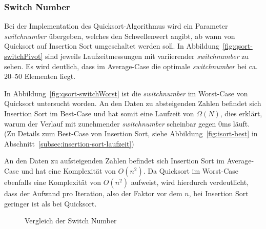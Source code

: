 \FloatBarrier

\subsubsection{Switch Number}\label{subsubsec:switch-number}
Bei der Implementation des Quicksort-Algorithmus wird ein Parameter
\textit{switchnumber} übergeben, welches den Schwellenwert angibt, ab wann
von Quicksort auf Insertion Sort umgeschaltet werden soll.
In Abbildung~\ref{fig:qsort-switchPivot} sind
jeweils Laufzeitmessungen mit variierender \textit{switchnumber} zu sehen.
Es wird deutlich, dass im Average-Case die optimale \textit{switchnumber} bei
ca. 20--50 Elementen liegt.

In Abbildung~\ref{fig:qsort-switchWorst} ist die \textit{switchnumber} im
Worst-Case von Quicksort untersucht worden.
An den Daten zu absteigenden Zahlen befindet sich Insertion Sort im Best-Case
und hat somit eine Laufzeit von \(\Omega(N)\), dies erklärt, warum der
Verlauf mit zunehmender \textit{switchnumber} scheinbar gegen 0ms läuft.
(Zu Details zum Best-Case von Insertion Sort, siehe
Abbildung~\ref{fig:isort-best} in
Abschnitt~\ref{subsec:insertion-sort-laufzeit})

An den Daten zu aufsteigenden Zahlen befindet sich Insertion Sort im
Average-Case und hat eine Komplexität von \(O(n^2)\).
Da Quicksort im Worst-Case ebenfalls eine Komplexität von \(O(n^2)\)
aufweist, wird hierdurch verdeutlicht, dass der Aufwand pro Iteration, also
der Faktor vor dem \(n\), bei Insertion Sort geringer ist als bei Quicksort.


\begin{figure}[hbt]
    \centering
    \caption{Vergleich der Switch Number}
\end{figure}

